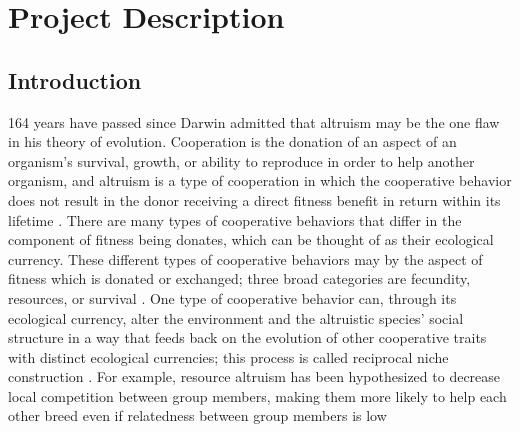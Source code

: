 
\section{Project Description}
\subsection{Introduction}

164 years have passed since Darwin admitted that altruism may be the one flaw in his theory of evolution. Cooperation is the donation of an aspect of an organism's survival, growth, or ability to reproduce in order to help another organism, and altruism is a type of cooperation in which the cooperative behavior does not result in the donor receiving a direct fitness benefit in return within its lifetime \cite{west_social_2007}. There are many types of cooperative behaviors that differ in the component of fitness being donates, which can be thought of as their ecological currency. These different types of cooperative behaviors may by the aspect of fitness which is donated or exchanged; three broad categories are fecundity, resources, or survival \cite{van_dyken_origins_2012}.  One type of cooperative behavior can, through its ecological currency, alter the environment and the altruistic species' social structure in a way that feeds back on the evolution of other cooperative traits with distinct ecological currencies; this process is called reciprocal niche construction \cite{odling-smee_niche_1996}. For example, resource altruism has been hypothesized to decrease local competition between group members, making them more likely to help each other breed even if relatedness between group members is low \cite{van_dyken_origins_2012_II} 

